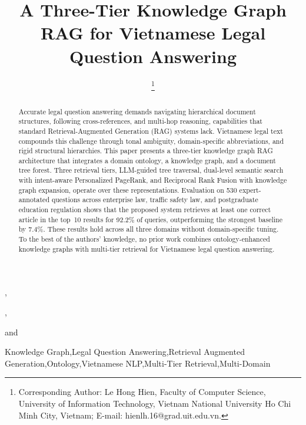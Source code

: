 \documentclass{IOS-Book-Article}
\def\hb{\hbox to 11.5 cm{}}
\begin{document}
\pagestyle{headings}
\def\thepage{}

\begin{frontmatter}

\title{A Three-Tier Knowledge Graph RAG for Vietnamese Legal Question Answering}

\markboth{}{April 2026\hb}

\author[A]{ %
\thanks{Corresponding Author: Le Hong Hien, Faculty of Computer Science, University of Information Technology, Vietnam National University Ho Chi Minh City, Vietnam; E-mail: hienlh.16@grad.uit.edu.vn.}},
\author[A]{ },
\author[B]{ }
and
\author[A]{ }

\address[A]{Faculty of Computer Science, University of Information Technology, Vietnam National University Ho Chi Minh City, Vietnam}
\address[B]{School of Computer Science, University College Dublin, Ireland}

\begin{abstract}
Accurate legal question answering demands navigating hierarchical document structures, following cross-references, and multi-hop reasoning, capabilities that standard Retrieval-Augmented Generation (RAG) systems lack. Vietnamese legal text compounds this challenge through tonal ambiguity, domain-specific abbreviations, and rigid structural hierarchies. This paper presents a three-tier knowledge graph RAG architecture that integrates a domain ontology, a knowledge graph, and a document tree forest. Three retrieval tiers, LLM-guided tree traversal, dual-level semantic search with intent-aware Personalized PageRank, and Reciprocal Rank Fusion with knowledge graph expansion, operate over these representations. Evaluation on 530 expert-annotated questions across enterprise law, traffic safety law, and postgraduate education regulation shows that the proposed system retrieves at least one correct article in the top~10 results for 92.2\% of queries, outperforming the strongest baseline by 7.4\%. These results hold across all three domains without domain-specific tuning. To the best of the authors' knowledge, no prior work combines ontology-enhanced knowledge graphs with multi-tier retrieval for Vietnamese legal question answering.
\end{abstract}

\begin{keyword}
Knowledge Graph\sep Legal Question Answering\sep Retrieval Augmented Generation\sep Ontology\sep Vietnamese NLP\sep Multi-Tier Retrieval\sep Multi-Domain
\end{keyword}

\end{frontmatter}
\markboth{April 2026\hb}{April 2026\hb}
\end{document}
